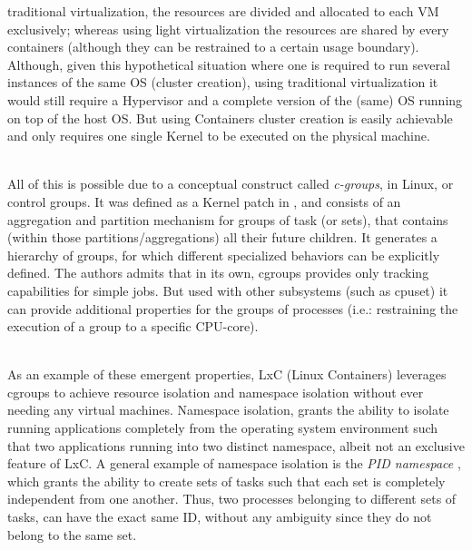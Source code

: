 \documentclass[11pt]{amsart}
\begin{document}
\begin{enumarate}
        traditional virtualization, the resources are divided and allocated to each VM
        exclusively; whereas using light virtualization the resources are shared by every
        containers (although they can be restrained to a certain usage
        boundary). Although, given this hypothetical situation where one is required to
        run several instances of the same OS (cluster creation), using traditional
        virtualization it would still require a Hypervisor and a complete version of the
        (same) OS running on top of the host OS. But using Containers cluster creation is
        easily achievable and only requires one single Kernel to be executed on the
        physical machine.

        \\ All of this is possible due to a conceptual construct called \emph{c-groups},
        in Linux, or control groups. It was defined as a Kernel patch in
        \cite{cgroups}, and consists of an aggregation and partition mechanism for
        groups of task (or sets), that contains (within those partitions/aggregations) all
        their future children. It generates a hierarchy of groups, for which different
        specialized behaviors can be explicitly defined. The authors admits that in its
        own, cgroups provides only tracking capabilities for simple jobs. But used with
        other subsystems (such as cpuset) it can provide additional properties for the
        groups of processes (i.e.: restraining the execution of a group to a specific
        CPU-core).
        
        \\ As an example of these emergent properties, LxC (Linux Containers)
        leverages cgroups to achieve resource isolation and namespace isolation without
        ever needing any virtual machines. Namespace isolation, grants the ability to
        isolate running applications completely from the operating system environment such
        that two applications running into two distinct namespace, albeit not an exclusive
        feature of LxC. A general example of namespace isolation is the \emph{PID
          namespace} \cite{emelyanov2007pid}, which grants the ability to create sets of
          tasks such that each set is completely independent from one another. Thus, two
          processes belonging to different sets of tasks, can have the exact same ID,
          without any ambiguity since they do not belong to the same set. 


\end{enumarate}
\end{document}
